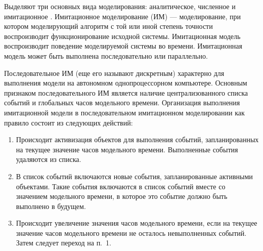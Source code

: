 



Выделяют три основных вида моделирования: аналитическое, численное и имитационное \cite{disksobmod}. Имитационное моделирование (ИМ)  --- моделирование, при котором моделирующий алгоритм с той или иной степень точности воспроизводит функционирование исходной системы. Имитационная модель воспроизводит поведение моделируемой системы во времени. Имитационная модель может быть выполнена последовательно или параллельно.

Последовательное ИМ (еще его называют дискретным) характерно для выполнения модели на автономном однопроцессорном компьютере. Основным признаком последовательного ИМ является наличие централизованного списка событий и глобальных часов модельного времени. Организация выполнения имитационной модели в последовательном имитационном моделировании как правило состоит из следующих действий:
\begin{enumerate}
	\item Происходит активизация объектов для выполнения событий, запланированных на текущее значение часов модельного времени. Выполненные события удаляются из списка.
	\item В список событий включаются новые события, запланированные активными объектами. Такие события включаются в список событий вместе со значением модельного времени, в которое это событие должно быть выполнено в будущем.
	\item Происходит увеличение значения часов модельного времени, если на текущее значение часов модельного времени не осталось невыполненных событий. Затем следует переход на п.~1.
\end{enumerate}

